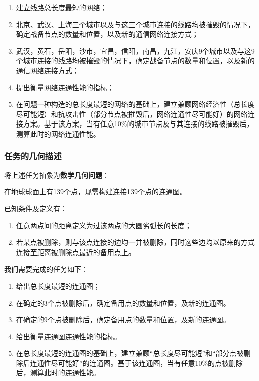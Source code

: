 \documentclass{article}
\begin{document}
\begin{enumerate}
	\item 建立线路总长度最短的网络；
	\item 北京、武汉、上海三个城市以及与这三个城市连接的线路均被摧毁的情况下，确定战备节点的数量和位置，以及新的通信网络连接方式；
	\item 武汉，黄石，岳阳，沙市，宜昌，信阳，南昌，九江，安庆9个城市以及与这9个城市连接的线路均被摧毁的情况下，确定战备节点的数量和位置，以及新的通信网络连接方式；
	\item 提出衡量网络连通性能的指标；
	\item 在问题一种构造的总长度最短的网络的基础上，建立兼顾网络经济性（总长度尽可能短）和抗攻击性（部分节点被摧毁后，网络连通性尽可能好）的网络连接方案。基于该方案，当有任意10\%的城市节点及与其连接的线路被摧毁后，测算此时的网络连通性能。
\end{enumerate}

\subsubsection{任务的几何描述}
\label{sub:任务的几何描述}

将上述任务抽象为\textbf{数学几何问题}：

在地球球面上有139个点，现需构建连接139个点的连通图。

已知条件及定义有：

\begin{enumerate}
	\item 任意两点间的距离定义为过该两点的大圆劣弧长的长度；
	\item 若某点被删除，则与该点连接的边均一并被删除，同时这些边均以原来的方式连接至距离被删除点最近的备用点上。
\end{enumerate}

我们需要完成的任务如下：

\begin{enumerate}
	\item 给出总长度最短的连通图；
	\item 在确定的3个点被删除后，确定备用点的数量和位置，及新的连通图。
	\item 在确定的9个点被删除后，确定备用点的数量和位置，及新的连通图。
	\item 给出衡量连通图连通性能的指标。
	\item 在总长度最短的连通图的基础上，建立兼顾“总长度尽可能短”和“部分点被删除后连通性尽可能好”的连通图。基于该连通图，当有任意10\%的点被删除后，测算此时的连通性能。
\end{enumerate}
\end{document}
